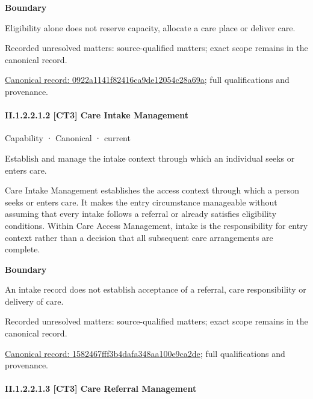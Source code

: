 \textbf{Boundary}



Eligibility alone does not reserve capacity, allocate a care place or deliver care.


{\small Recorded unresolved matters: source-qualified matters; exact scope remains in the canonical record.}\par
{\footnotesize \href{../../../../continuum/strategy/capability/0922a1141f82416ca9de12054c28a69a.md}{Canonical record: 0922a1141f82416ca9de12054c28a69a}; full qualifications and provenance.}\par
\paragraph*{II.1.2.2.1.2 [CT3] Care Intake Management}
\label{navigation:II.1.2.2.1.2}

\label{element:1582467fff3b4dafa348aa100e9ca2de}
{\small Capability · Canonical · current}\par

Establish and manage the intake context through which an individual seeks or enters care.



Care Intake Management establishes the access context through which a person seeks or enters care. It makes the entry circumstance manageable without assuming that every intake follows a referral or already satisfies eligibility conditions. Within Care Access Management, intake is the responsibility for entry context rather than a decision that all subsequent care arrangements are complete.



\textbf{Boundary}



An intake record does not establish acceptance of a referral, care responsibility or delivery of care.


{\small Recorded unresolved matters: source-qualified matters; exact scope remains in the canonical record.}\par
{\footnotesize \href{../../../../continuum/strategy/capability/1582467fff3b4dafa348aa100e9ca2de.md}{Canonical record: 1582467fff3b4dafa348aa100e9ca2de}; full qualifications and provenance.}\par
\paragraph*{II.1.2.2.1.3 [CT3] Care Referral Management}
\label{navigation:II.1.2.2.1.3}

